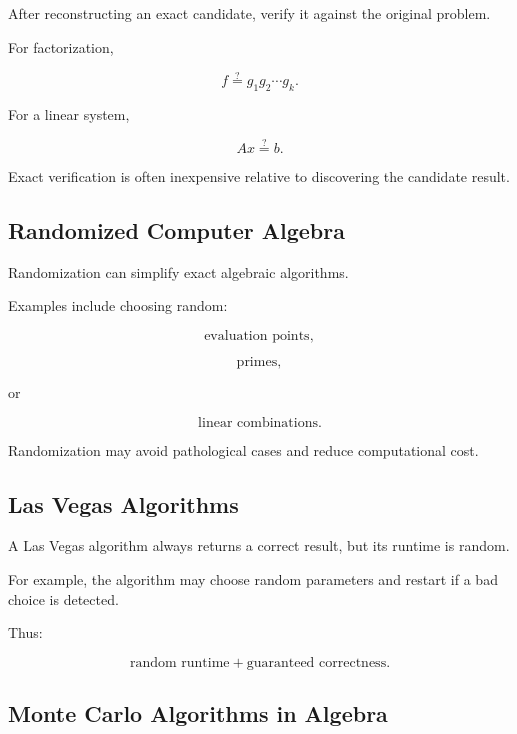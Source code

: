 After reconstructing an exact candidate, verify it against the original
problem.

For factorization,

\[
\boxed{
f
\stackrel{?}{=}
g_1g_2\cdots g_k.
}
\]

For a linear system,

\[
\boxed{
Ax
\stackrel{?}{=}
b.
}
\]

Exact verification is often inexpensive relative to discovering the
candidate result.

\subsection{Randomized Computer Algebra}
\label{subsec:randomized-computer-algebra}

Randomization can simplify exact algebraic algorithms.

Examples include choosing random:

\[
\boxed{
\text{evaluation points},
}
\]

\[
\boxed{
\text{primes},
}
\]

or

\[
\boxed{
\text{linear combinations}.
}
\]

Randomization may avoid pathological cases and reduce computational cost.

\subsection{Las Vegas Algorithms}
\label{subsec:las-vegas-algebra}

A Las Vegas algorithm always returns a correct result, but its runtime is
random.

For example, the algorithm may choose random parameters and restart if a
bad choice is detected.

Thus:

\[
\boxed{
\text{random runtime}
+
\text{guaranteed correctness}.
}
\]

\subsection{Monte Carlo Algorithms in Algebra}
\label{subsec:monte-carlo-algebra}

